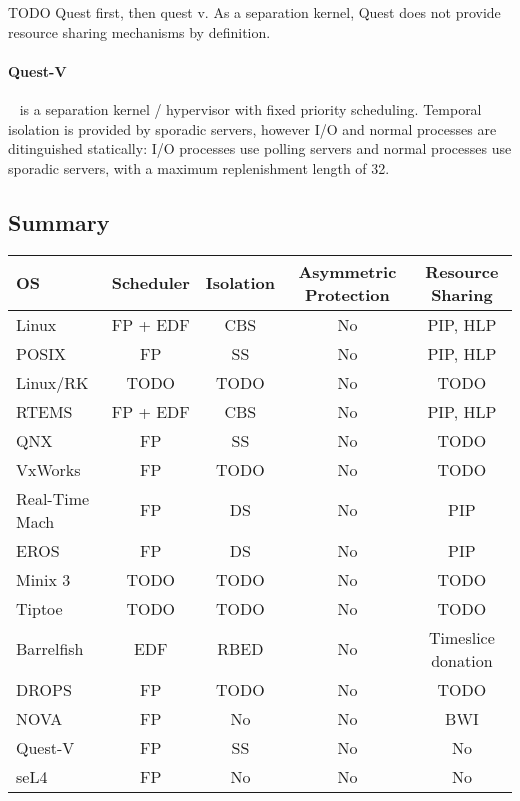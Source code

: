 TODO Quest first, then quest v. 
As a separation kernel, Quest does not provide resource sharing mechanisms by definition. 

\paragraph{Quest-V}~\citep{Danish_LW_2011} is a separation kernel / hypervisor with fixed priority scheduling.
Temporal isolation is provided by sporadic servers, however I/O and normal processes are ditinguished statically: I/O processes use polling servers and normal processes use sporadic servers, with a maximum replenishment length of 32.


\subsection{Summary}


\begin{tabular}{|l|c|c|c|c|}\hline
\textbf{OS} & \textbf{Scheduler}  & \textbf{Isolation} & \textbf{Asymmetric Protection} & \textbf{Resource Sharing}\\\hline
Linux       & \gls{FP} + \gls{EDF} & \gls{CBS}          & No  & \gls{PIP}, \gls{HLP}\\\hline
POSIX       & \gls{FP}             & \gls{SS}           & No  & \gls{PIP}, \gls{HLP} \\\hline
Linux/RK    & TODO                 & TODO               & No  & TODO \\\hline
RTEMS       & \gls{FP} + \gls{EDF} & \gls{CBS}          & No  & \gls{PIP}, \gls{HLP}\\\hline
QNX         & \gls{FP}             & \gls{SS}           & No  & TODO \\\hline
VxWorks     & \gls{FP}             & TODO               & No  & TODO  \\\hline
Real-Time Mach & \gls{FP}          & \gls{DS}           & No  & \gls{PIP} \\\hline
EROS        & \gls{FP}             & \gls{DS}           & No  & \gls{PIP} \\\hline
Minix 3     & TODO                 & TODO               & No  & TODO \\\hline
Tiptoe      & TODO                 & TODO               & No  & TODO   \\\hline
Barrelfish  & \gls{EDF}            & \gls{RBED}         & No  & Timeslice donation   \\\hline
DROPS       & \gls{FP}             & TODO               & No  & TODO \\\hline
NOVA        & \gls{FP}             & No                 & No  & \gls{BWI} \\\hline
Quest-V     & \gls{FP}             & \gls{SS}           & No  & No \\\hline
seL4        & \gls{FP}             & No                 & No  & No \\\hline
\end{tabular}


